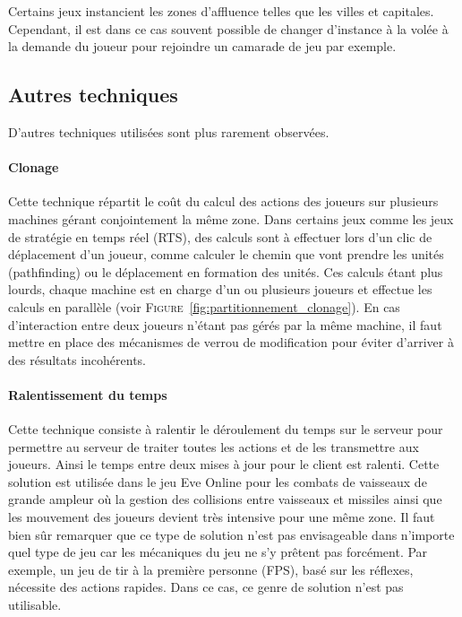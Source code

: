 Certains jeux instancient les zones d'affluence telles que les villes et capitales.
Cependant, il est dans ce cas souvent possible de changer d'instance à la volée à la demande du joueur pour rejoindre un camarade de jeu par exemple.

\subsection{Autres techniques}
D'autres techniques utilisées sont plus rarement observées.
\paragraph{Clonage\\}
Cette technique répartit le coût du calcul des actions des joueurs sur plusieurs machines gérant conjointement la même zone.
Dans certains jeux comme les jeux de stratégie en temps réel (RTS), des calculs sont à effectuer lors d'un clic de déplacement d'un joueur, comme calculer le chemin que vont prendre les unités (pathfinding) ou le déplacement en formation des unités.
Ces calculs étant plus lourds, chaque machine est en charge d'un ou plusieurs joueurs et effectue les calculs en parallèle (voir \textsc{Figure}~\ref{fig:partitionnement_clonage}).
En cas d'interaction entre deux joueurs n'étant pas gérés par la même machine, il faut mettre en place des mécanismes de verrou de modification pour éviter d'arriver à des résultats incohérents.
\paragraph{Ralentissement du temps\\}
Cette technique consiste à ralentir le déroulement du temps sur le serveur pour permettre au serveur de traiter toutes les actions et de les transmettre aux joueurs.
Ainsi le temps entre deux mises à jour pour le client est ralenti.
Cette solution est utilisée dans le jeu Eve Online pour les combats de vaisseaux de grande ampleur où la gestion des collisions entre vaisseaux et missiles ainsi que les mouvement des joueurs devient très intensive pour une même zone.
Il faut bien sûr remarquer que ce type de solution n'est pas envisageable dans n'importe quel type de jeu car les mécaniques du jeu ne s'y prêtent pas forcément.
Par exemple, un jeu de tir à la première personne (FPS), basé sur les réflexes, nécessite des actions rapides.
Dans ce cas, ce genre de solution n'est pas utilisable.

